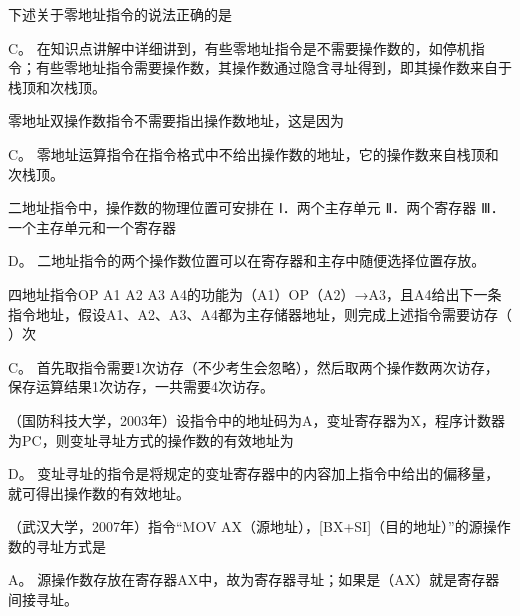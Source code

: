 \question 下述关于零地址指令的说法正确的是
\par{}
\begin{solution}C。
在知识点讲解中详细讲到，有些零地址指令是不需要操作数的，如停机指令；有些零地址指令需要操作数，其操作数通过隐含寻址得到，即其操作数来自于栈顶和次栈顶。
\end{solution}
\question 零地址双操作数指令不需要指出操作数地址，这是因为
\par{}
\begin{solution}C。
零地址运算指令在指令格式中不给出操作数的地址，它的操作数来自栈顶和次栈顶。
\end{solution}
\question 二地址指令中，操作数的物理位置可安排在 Ⅰ．两个主存单元 Ⅱ．两个寄存器
Ⅲ．一个主存单元和一个寄存器
\par{}
\begin{solution}D。 二地址指令的两个操作数位置可以在寄存器和主存中随便选择位置存放。
\end{solution}
\question 四地址指令OP A1 A2 A3
A4的功能为（A1）OP（A2）→A3，且A4给出下一条指令地址，假设A1、A2、A3、A4都为主存储器地址，则完成上述指令需要访存（
）次
\par{}
\begin{solution}C。
首先取指令需要1次访存（不少考生会忽略），然后取两个操作数两次访存，保存运算结果1次访存，一共需要4次访存。
\end{solution}
\question （国防科技大学，2003年）设指令中的地址码为A，变址寄存器为X，程序计数器为PC，则变址寻址方式的操作数的有效地址为
\par{}
\begin{solution}D。
变址寻址的指令是将规定的变址寄存器中的内容加上指令中给出的偏移量，就可得出操作数的有效地址。
\end{solution}
\question （武汉大学，2007年）指令``MOV
AX（源地址），{[}BX+SI{]}（目的地址）''的源操作数的寻址方式是
\par{}
\begin{solution}A。
源操作数存放在寄存器AX中，故为寄存器寻址；如果是（AX）就是寄存器间接寻址。
\end{solution}
